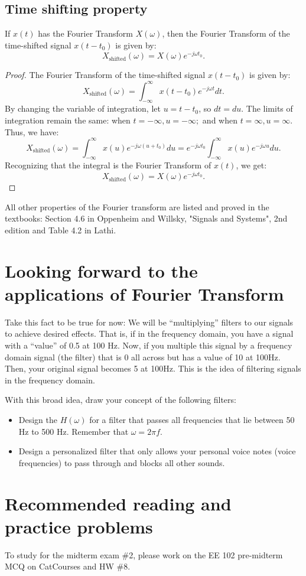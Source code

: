 \documentclass{ee102_notes}
\begin{document}
\subsection{Time shifting property}
If $x(t)$ has the Fourier Transform $X(\omega)$, then the Fourier Transform of the time-shifted signal $x(t - t_0)$ is given by:
\[
X_{\text{shifted}}(\omega) = X(\omega) e^{-j \omega t_0}.
\]
\begin{proof}
The Fourier Transform of the time-shifted signal $x(t - t_0)$ is given by:
\[
X_{\text{shifted}}(\omega) = \int_{-\infty}^{\infty} x(t - t_0) e^{-j \omega t} dt.
\]
By changing the variable of integration, let $u = t - t_0$, so $dt = du$. The limits of integration remain the same: when $t = -\infty, u = -\infty;$ and when $t = \infty, u = \infty$. Thus, we have:
\[
X_{\text{shifted}}(\omega) = \int_{-\infty}^{\infty} x(u) e^{-j \omega (u + t_0)} du = e^{-j \omega t_0} \int_{-\infty}^{\infty} x(u) e^{-j \omega u} du.
\]
Recognizing that the integral is the Fourier Transform of $x(t)$, we get:
\[
X_{\text{shifted}}(\omega) = X(\omega) e^{-j \omega t_0}.
\]
\end{proof}
All other properties of the Fourier transform are listed and proved in the textbooks: Section 4.6 in Oppenheim and Willsky, "Signals and Systems", 2nd edition and Table 4.2 in Lathi. 
\section{Looking forward to the applications of Fourier Transform}
Take this fact to be true for now: We will be ``multiplying'' filters to our signals to achieve desired effects. That is, if in the frequency domain, you have a signal with a ``value'' of 0.5 at 100 Hz. Now, if you multiple this signal by a frequency domain signal (the filter) that is 0 all across but has a value of 10 at 100Hz. Then, your original signal becomes 5 at 100Hz. This is the idea of filtering signals in the frequency domain.

With this broad idea, draw your concept of the following filters:

\begin{itemize}
    \item Design the $H(\omega)$ for a filter that passes all frequencies that lie between 50 Hz to 500 Hz. Remember that $\omega = 2 \pi f$.
    \item Design a personalized filter that only allows your personal voice notes (voice frequencies) to pass through and blocks all other sounds.
\end{itemize}
\section{Recommended reading and practice problems}
To study for the midterm exam \#2, please work on the EE 102 pre-midterm MCQ on CatCourses and HW \#8.
\end{document}
